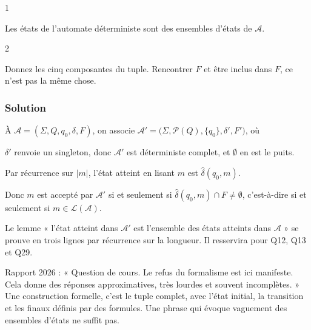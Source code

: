 \documentclass[11pt,a4paper]{article}
\newcommand{\equationajustee}[1]{%
  \sbox{\boiteequation}{$\displaystyle #1$}%
  \ifdim\wd\boiteequation>\linewidth
    \[\resizebox{\linewidth}{!}{\usebox{\boiteequation}}\]%
  \else
    \[#1\]%
  \fi}
\begin{document}
\begin{indication}{1}

Les états de l'automate déterministe sont des ensembles d'états de \(\mathcal{A}\).

\end{indication}

\begin{indication}{2}

Donnez les cinq composantes du tuple. Rencontrer \(F\) et être inclus dans \(F\), ce n'est pas la même chose.

\end{indication}

\hypertarget{solution-9}{%
\subsubsection{Solution}\label{solution-9}}

À \(\mathcal{A}=(\Sigma,Q,q_0,\delta,F)\), on associe \(\mathcal{A}'=\big(\Sigma,\allowbreak \mathcal{P}(Q),\allowbreak \{q_0\},\allowbreak \delta',\allowbreak F'\big)\), où
\equationajustee{\begin{aligned}
\delta'(S,a)&=\Big\{\textstyle\bigcup_{q\in S}\delta(q,a)\Big\}\qquad\text{pour } S\subseteq Q,\ a\in\Sigma,\\
F'&=\{S\subseteq Q:\ S\cap F\ne\emptyset\}.
\end{aligned}}

\(\delta'\) renvoie un singleton, donc \(\mathcal{A}'\) est déterministe complet, et \(\emptyset\) en est le puits.

Par récurrence sur \(\lvert m\rvert\), l'état atteint en lisant \(m\) est \(\widehat{\delta}(q_0,m)\).

Donc \(m\) est accepté par \(\mathcal{A}'\) si et seulement si \(\widehat{\delta}(q_0,m)\cap F\ne\emptyset\), c'est-à-dire si et seulement si \(m\in\mathcal{L}(\mathcal{A})\).

\begin{methode}

Le lemme « l'état atteint dans \(\mathcal{A}'\) est l'ensemble des états atteints dans \(\mathcal{A}\) » se prouve en trois lignes par récurrence sur la longueur. Il resservira pour Q12, Q13 et Q29.

\end{methode}

\begin{jury}

Rapport 2026 : « Question de cours. Le refus du formalisme est ici manifeste. Cela donne des réponses approximatives, très lourdes et souvent incomplètes. » Une construction formelle, c'est le tuple complet, avec l'état initial, la transition et les finaux définis par des formules. Une phrase qui évoque vaguement des ensembles d'états ne suffit pas.

\end{jury}
\end{document}
